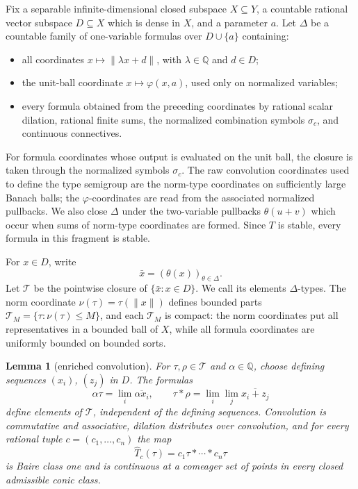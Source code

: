 \documentclass[11pt]{article}
\newtheorem{lemma}{Lemma}
\newcommand{\Q}{\mathbb{Q}}
\newcommand{\T}{\mathcal{T}}
\begin{document}
Fix a separable infinite-dimensional closed subspace \(X\subseteq Y\), a
countable rational vector subspace \(D\subseteq X\) which is dense in \(X\),
and a parameter \(a\). Let \(\Delta\) be a countable family of one-variable
formulas over \(D\cup\{a\}\) containing:
\begin{itemize}
\item all coordinates \(x\mapsto \|\lambda x+d\|\), with
  \(\lambda\in\Q\) and \(d\in D\);
\item the unit-ball coordinate \(x\mapsto \varphi(x,a)\), used only on
  normalized variables;
\item every formula obtained from the preceding coordinates by rational
  scalar dilation, rational finite sums, the normalized combination symbols
  \(\sigma_c\), and continuous connectives.
\end{itemize}
For formula coordinates whose output is evaluated on the unit ball, the
closure is taken through the normalized symbols \(\sigma_c\). The raw
convolution coordinates used to define the type semigroup are the norm-type
coordinates on sufficiently large Banach balls; the \(\varphi\)-coordinates
are read from the associated normalized pullbacks. We also close \(\Delta\)
under the two-variable pullbacks \(\theta(u+v)\) which occur when sums of
norm-type coordinates are formed. Since \(T\) is stable, every formula in this
fragment is stable.

For \(x\in D\), write
\[
  \bar x=(\theta(x))_{\theta\in\Delta}.
\]
Let \(\T\) be the pointwise closure of \(\{\bar x:x\in D\}\). We call its
elements \(\Delta\)-types. The norm coordinate
\(\nu(\tau)=\tau(\|x\|)\) defines bounded parts
\(\T_M=\{\tau:\nu(\tau)\le M\}\), and each \(\T_M\) is compact: the norm
coordinates put all representatives in a bounded ball of \(X\), while all
formula coordinates are uniformly bounded on bounded sorts.

\begin{lemma}[enriched convolution]\label{lem:enriched-conv}
For \(\tau,\rho\in\T\) and \(\alpha\in\Q\), choose defining sequences
\((x_i)\), \((z_j)\) in \(D\). The formulas
\[
  \alpha\tau=\lim_i\overline{\alpha x_i},
  \qquad
  \tau*\rho=\lim_i\lim_j\overline{x_i+z_j}
\]
define elements of \(\T\), independent of the defining sequences. Convolution
is commutative and associative, dilation distributes over convolution, and
for every rational tuple \(c=(c_1,\ldots,c_n)\) the map
\[
  \widehat T_c(\tau)=c_1\tau*\cdots*c_n\tau
\]
is Baire class one and is continuous at a comeager set of points in every
closed admissible conic class.
\end{lemma}
\end{document}
